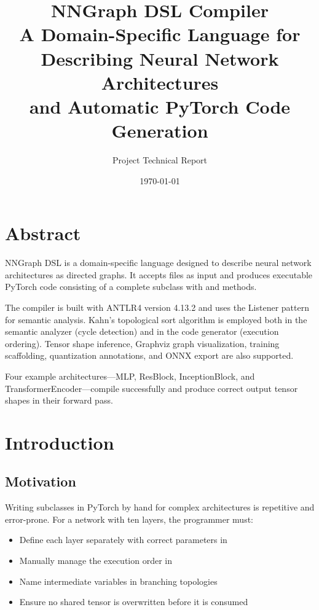 \documentclass{nngraph-en}
\title{
    \textbf{NNGraph DSL Compiler} \\[0.5em]
    \large A Domain-Specific Language for Describing Neural Network Architectures \\
    and Automatic PyTorch Code Generation
}
\author{\large Project Technical Report}
\date{\today}
\begin{document}
\maketitle
\tableofcontents
\newpage

\chapter*{Abstract}

NNGraph DSL is a domain-specific language designed to describe
neural network architectures as directed graphs. It accepts
 files as input and produces executable PyTorch code
consisting of a complete  subclass with
 and  methods.

The compiler is built with ANTLR4 version 4.13.2 and uses the
Listener pattern for semantic analysis. Kahn's topological sort
algorithm is employed both in the semantic analyzer (cycle detection)
and in the code generator (execution ordering). Tensor shape
inference, Graphviz graph visualization, training scaffolding,
quantization annotations, and ONNX export are also supported.

Four example
architectures---MLP, ResBlock, InceptionBlock, and
TransformerEncoder---compile successfully and produce correct
output tensor shapes in their forward pass.

\chapter{Introduction}

\section{Motivation}

Writing  subclasses in PyTorch by hand for complex
architectures is repetitive and error-prone. For a network with
ten layers, the programmer must:

\begin{itemize}
    \item Define each layer separately with correct parameters in
    \item Manually manage the execution order in 
    \item Name intermediate variables in branching topologies
    \item Ensure no shared tensor is overwritten before it is consumed
\end{itemize}
\end{document}

